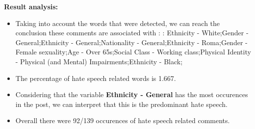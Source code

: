 \documentclass[11pt]{article}
\begin{document}
\textbf{\Large Result analysis:}

\begin{itemize}\item Taking into account the words that were detected, we can reach the conclusion these comments are associated with : : Ethnicity - White;Gender - General;Ethnicity - General;Nationality - General;Ethnicity - Roma;Gender - Female sexuality;Age - Over 65s;Social Class - Working class;Physical Identity - Physical (and Mental) Impairments;Ethnicity - Black;%

\item The percentage of hate speech related words is 1.667.

\item Considering that the variable \textbf{Ethnicity - General} has the most occurences in the post, we can interpret that this is the predominant hate speech.

\item Overall there were 92/139 occurences of hate speech related comments.\end{itemize}
\end{document}
